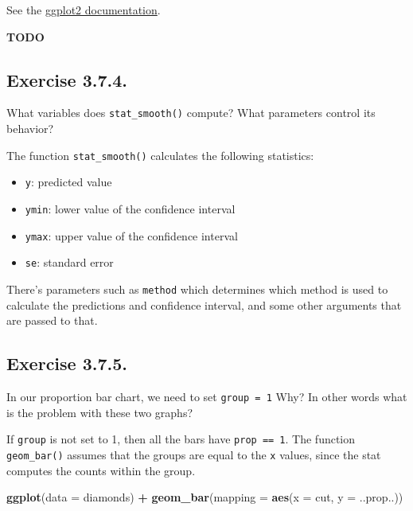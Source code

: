 \documentclass[]{book}
\newenvironment{Shaded}{\begin{snugshade}}{\end{snugshade}}
\newcommand{\DataTypeTok}[1]{\textcolor[rgb]{0.13,0.29,0.53}{#1}}
\newcommand{\KeywordTok}[1]{\textcolor[rgb]{0.13,0.29,0.53}{\textbf{#1}}}
\newcommand{\NormalTok}[1]{#1}
\newcommand{\OperatorTok}[1]{\textcolor[rgb]{0.81,0.36,0.00}{\textbf{#1}}}
\newcommand{\StringTok}[1]{\textcolor[rgb]{0.31,0.60,0.02}{#1}}
\providecommand{\tightlist}{%
  \setlength{\itemsep}{0pt}\setlength{\parskip}{0pt}}
\theoremstyle{plain}
\theoremstyle{remark}
\begin{document}
See the \href{https://ggplot2.tidyverse.org/reference/}{ggplot2
documentation}.

\textbf{TODO}

\hypertarget{exercise-3.7.4.}{%
\subsection*{\texorpdfstring{Exercise
{3.7.4}.}{Exercise 3.7.4.}}\label{exercise-3.7.4.}}

What variables does \texttt{stat\_smooth()} compute? What parameters
control its behavior?

The function \texttt{stat\_smooth()} calculates the following
statistics:

\begin{itemize}
\tightlist
\item
  \texttt{y}: predicted value
\item
  \texttt{ymin}: lower value of the confidence interval
\item
  \texttt{ymax}: upper value of the confidence interval
\item
  \texttt{se}: standard error
\end{itemize}

There's parameters such as \texttt{method} which determines which method
is used to calculate the predictions and confidence interval, and some
other arguments that are passed to that.

\hypertarget{exercise-3.7.5.}{%
\subsection*{\texorpdfstring{Exercise
{3.7.5}.}{Exercise 3.7.5.}}\label{exercise-3.7.5.}}

In our proportion bar chart, we need to set \texttt{group\ =\ 1} Why? In
other words what is the problem with these two graphs?

If \texttt{group} is not set to 1, then all the bars have
\texttt{prop\ ==\ 1}. The function \texttt{geom\_bar()} assumes that the
groups are equal to the \texttt{x} values, since the stat computes the
counts within the group.

\begin{Shaded}
\begin{Highlighting}[]
\KeywordTok{ggplot}\NormalTok{(}\DataTypeTok{data =}\NormalTok{ diamonds) }\OperatorTok{+}
\StringTok{  }\KeywordTok{geom_bar}\NormalTok{(}\DataTypeTok{mapping =} \KeywordTok{aes}\NormalTok{(}\DataTypeTok{x =}\NormalTok{ cut, }\DataTypeTok{y =}\NormalTok{ ..prop..))}
\end{Highlighting}
\end{Shaded}
\end{document}
